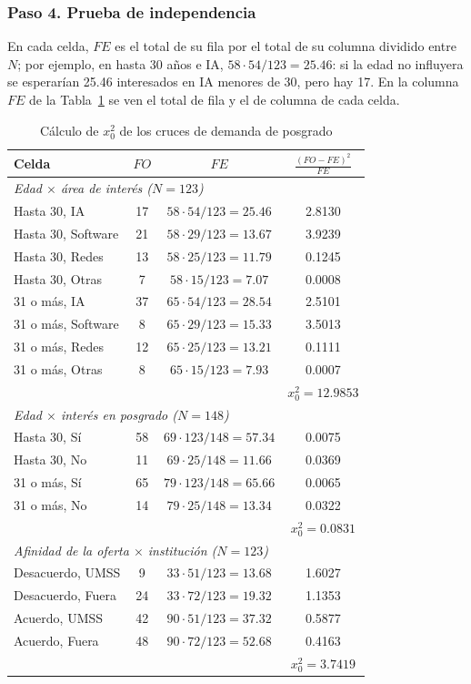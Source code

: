 \documentclass[12pt, a4paper]{article}
\newenvironment{mitabla}[2][H]{%
  \begin{table}[#1]
  \centering
  \caption{#2}
  \small
}{%
  \end{table}
}
\begin{document}
\subsubsection{Paso 4. Prueba de independencia}

En cada celda, $FE$ es el total de su fila por el total de su columna
dividido entre $N$; por ejemplo, en hasta 30 años e IA, $58 \cdot 54/123
= 25.46$: si la edad no influyera se esperarían 25.46 interesados en IA
menores de 30, pero hay 17. En la columna $FE$ de la
Tabla~\ref{tab:a2-chi} se ven el total de fila y el de columna de cada
celda.

\begin{mitabla}{Cálculo de $x_0^2$ de los cruces de demanda de posgrado}\label{tab:a2-chi}
\begin{tabular}{lccc}
\toprule
\textbf{Celda} & \textbf{$FO$} & \textbf{$FE$} & \textbf{$\frac{(FO-FE)^2}{FE}$} \\
\midrule
\multicolumn{4}{l}{\textit{Edad $\times$ área de interés ($N = 123$)}} \\
Hasta 30, IA & 17 & $58 \cdot 54/123 = 25.46$ & 2.8130 \\
Hasta 30, Software & 21 & $58 \cdot 29/123 = 13.67$ & 3.9239 \\
Hasta 30, Redes & 13 & $58 \cdot 25/123 = 11.79$ & 0.1245 \\
Hasta 30, Otras & 7 & $58 \cdot 15/123 = 7.07$ & 0.0008 \\
31 o más, IA & 37 & $65 \cdot 54/123 = 28.54$ & 2.5101 \\
31 o más, Software & 8 & $65 \cdot 29/123 = 15.33$ & 3.5013 \\
31 o más, Redes & 12 & $65 \cdot 25/123 = 13.21$ & 0.1111 \\
31 o más, Otras & 8 & $65 \cdot 15/123 = 7.93$ & 0.0007 \\
 & & & $x_0^2 = 12.9853$ \\
\midrule
\multicolumn{4}{l}{\textit{Edad $\times$ interés en posgrado ($N = 148$)}} \\
Hasta 30, Sí & 58 & $69 \cdot 123/148 = 57.34$ & 0.0075 \\
Hasta 30, No & 11 & $69 \cdot 25/148 = 11.66$ & 0.0369 \\
31 o más, Sí & 65 & $79 \cdot 123/148 = 65.66$ & 0.0065 \\
31 o más, No & 14 & $79 \cdot 25/148 = 13.34$ & 0.0322 \\
 & & & $x_0^2 = 0.0831$ \\
\midrule
\multicolumn{4}{l}{\textit{Afinidad de la oferta $\times$ institución ($N = 123$)}} \\
Desacuerdo, UMSS & 9 & $33 \cdot 51/123 = 13.68$ & 1.6027 \\
Desacuerdo, Fuera & 24 & $33 \cdot 72/123 = 19.32$ & 1.1353 \\
Acuerdo, UMSS & 42 & $90 \cdot 51/123 = 37.32$ & 0.5877 \\
Acuerdo, Fuera & 48 & $90 \cdot 72/123 = 52.68$ & 0.4163 \\
 & & & $x_0^2 = 3.7419$ \\
\bottomrule
\end{tabular}
\end{mitabla}
\end{document}
